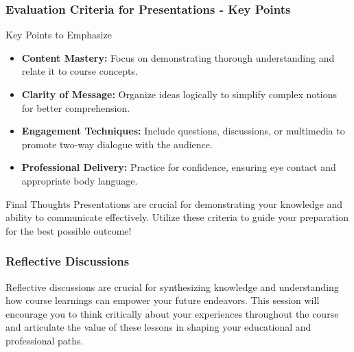 \documentclass[aspectratio=169]{beamer}
\begin{document}
\begin{frame}[fragile]
    \frametitle{Evaluation Criteria for Presentations - Key Points}
    \begin{block}{Key Points to Emphasize}
        \begin{itemize}
            \item \textbf{Content Mastery:} 
                Focus on demonstrating thorough understanding and relate it to course concepts.
            \item \textbf{Clarity of Message:} 
                Organize ideas logically to simplify complex notions for better comprehension.
            \item \textbf{Engagement Techniques:} 
                Include questions, discussions, or multimedia to promote two-way dialogue with the audience.
            \item \textbf{Professional Delivery:} 
                Practice for confidence, ensuring eye contact and appropriate body language.
        \end{itemize}
    \end{block}
    
    \begin{block}{Final Thoughts}
        Presentations are crucial for demonstrating your knowledge and ability to communicate effectively. 
        Utilize these criteria to guide your preparation for the best possible outcome!
    \end{block}
\end{frame}

\begin{frame}[fragile]
    \frametitle{Reflective Discussions}
    Reflective discussions are crucial for synthesizing knowledge and understanding how course learnings can empower your future endeavors. This session will encourage you to think critically about your experiences throughout the course and articulate the value of these lessons in shaping your educational and professional paths.
\end{frame}
\end{document}
